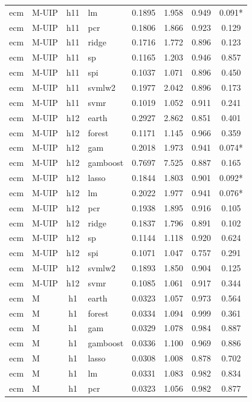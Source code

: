 \begin{ThreePartTable}
\begin{longtable}[t]{llclcccc}
ecm & M-UIP & h11 & lm & 0.1895 & 1.958 & 0.949 & 0.091*\\
ecm & M-UIP & h11 & pcr & 0.1806 & 1.866 & 0.923 & 0.129\\
ecm & M-UIP & h11 & ridge & 0.1716 & 1.772 & 0.896 & 0.123\\
ecm & M-UIP & h11 & sp & 0.1165 & 1.203 & 0.946 & 0.857\\
ecm & M-UIP & h11 & spi & 0.1037 & 1.071 & 0.896 & 0.450\\
ecm & M-UIP & h11 & svmlw2 & 0.1977 & 2.042 & 0.896 & 0.173\\
ecm & M-UIP & h11 & svmr & 0.1019 & 1.052 & 0.911 & 0.241\\
\addlinespace
ecm & M-UIP & h12 & earth & 0.2927 & 2.862 & 0.851 & 0.401\\
ecm & M-UIP & h12 & forest & 0.1171 & 1.145 & 0.966 & 0.359\\
ecm & M-UIP & h12 & gam & 0.2018 & 1.973 & 0.941 & 0.074*\\
ecm & M-UIP & h12 & gamboost & 0.7697 & 7.525 & 0.887 & 0.165\\
ecm & M-UIP & h12 & lasso & 0.1844 & 1.803 & 0.901 & 0.092*\\
ecm & M-UIP & h12 & lm & 0.2022 & 1.977 & 0.941 & 0.076*\\
ecm & M-UIP & h12 & pcr & 0.1938 & 1.895 & 0.916 & 0.105\\
ecm & M-UIP & h12 & ridge & 0.1837 & 1.796 & 0.891 & 0.102\\
ecm & M-UIP & h12 & sp & 0.1144 & 1.118 & 0.920 & 0.624\\
ecm & M-UIP & h12 & spi & 0.1071 & 1.047 & 0.757 & 0.291\\
ecm & M-UIP & h12 & svmlw2 & 0.1893 & 1.850 & 0.904 & 0.125\\
ecm & M-UIP & h12 & svmr & 0.1085 & 1.061 & 0.917 & 0.344\\
\addlinespace
ecm & M & h1 & earth & 0.0323 & 1.057 & 0.973 & 0.564\\
ecm & M & h1 & forest & 0.0334 & 1.094 & 0.999 & 0.361\\
ecm & M & h1 & gam & 0.0329 & 1.078 & 0.984 & 0.887\\
ecm & M & h1 & gamboost & 0.0336 & 1.100 & 0.969 & 0.886\\
ecm & M & h1 & lasso & 0.0308 & 1.008 & 0.878 & 0.702\\
ecm & M & h1 & lm & 0.0331 & 1.083 & 0.982 & 0.834\\
ecm & M & h1 & pcr & 0.0323 & 1.056 & 0.982 & 0.877\\

\end{longtable}
\end{ThreePartTable}
